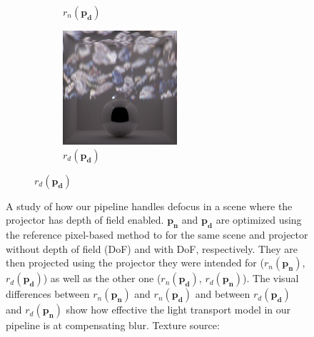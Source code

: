 \begin{figure}[]
\begin{subfigure}{\textwidth}
\begin{subfigure}{0.32\textwidth}
            \caption*{\(r_n(\bm{p_d})\)}
        \end{subfigure}
        \hfill
        \begin{subfigure}{0.32\textwidth}
            \centering
            \includegraphics[width=\textwidth]{images/04-experiment03/dof/defocused_on_dof.jpg}
            \caption*{\(r_d(\bm{p_d})\)}
        \end{subfigure}
    \end{subfigure}
    \caption{A study of how our pipeline handles defocus in a scene where the projector has depth of field enabled. \(\bm{p_n}\) and \(\bm{p_d}\) are optimized using the reference pixel-based method to for the same scene and projector without depth of field (DoF) and with DoF, respectively. They are then projected using the projector they were intended for (\(r_n(\bm{p_n})\), \(r_d(\bm{p_d})\)) as well as the other one (\(r_n(\bm{p_d})\), \(r_d(\bm{p_n})\)). The visual differences between \(r_n(\bm{p_n})\) and \(r_n(\bm{p_d})\) and between \(r_d(\bm{p_d})\) and \(r_d(\bm{p_n})\) show how effective the light transport model in our pipeline is at compensating blur. Texture source: \citet{Pixar128}}
    \label{fig:ex03-dof}
\end{figure}

